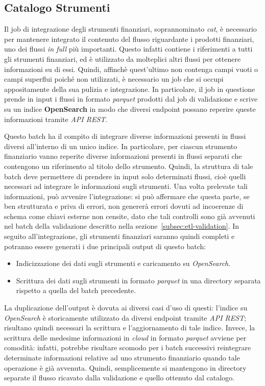 \subsection{Catalogo Strumenti}\label{subsec:etl-cat}
Il job di integrazione degli strumenti finanziari, soprannominato \textit{cat}, è necessario per mantenere integrato il contenuto del flusso riguardante i prodotti finanziari, uno dei flussi \textit{in full} più importanti.
Questo infatti contiene i riferimenti a tutti gli strumenti finanziari, ed è utilizzato da molteplici altri flussi per ottenere informazioni su di essi.
Quindi, affinchè quest'ultimo non contenga campi vuoti o campi superflui poiché non utilizzati, è necessario un job che si occupi appositamente della sua pulizia e integrazione.
In particolare, il job in questione prende in input i flussi in formato \textit{parquet} prodotti dal job di validazione e scrive su un indice \textbf{OpenSearch} in modo che diversi endpoint possano reperire queste informazioni tramite \textit{API REST}.

Questo batch ha il compito di integrare diverse informazioni presenti in flussi diversi all'interno di un unico indice.
In particolare, per ciascun strumento finanziario vanno reperite diverse informazioni presenti in flussi separati che contengono un riferimento al titolo dello strumento.
Quindi, la struttura di tale batch deve permettere di prendere in input solo determinati flussi, cioè quelli necessari ad integrare le informazioni sugli strumenti.
Una volta prelevate tali informazioni, può avvenire l'integrazione:
si può affermare che questa parte, se ben strutturata e priva di errori, non genererà errori dovuti ad incoerenze di schema come chiavi esterne non censite, dato che tali controlli sono già avvenuti nel batch della validazione descritto nella sezione~\ref{subsec:etl-validation}.
In seguito all'integrazione, gli strumenti finanziari saranno quindi completi e potranno essere generati i due principali output di questo batch:
\begin{itemize}
    \item Indicizzazione dei dati sugli strumenti e caricamento su \textit{OpenSearch}.
    \item Scrittura dei dati sugli strumenti in formato \textit{parquet} in una directory separata rispetto a quella del batch precedente.
\end{itemize}
La duplicazione dell'output è dovuta ai diversi casi d'uso di questi:
l'indice su \textit{OpenSearch} è storicamente utilizzato da diversi endpoint tramite \textit{API REST};
risultano quindi necessari la scrittura e l'aggiornamento di tale indice.
Invece, la scrittura delle medesime informazioni in \textit{cloud} in formato \textit{parquet} avviene per comodità:
infatti, potrebbe risultare scomodo per i batch successivi reintegrare determinate informazioni relative ad uno strumento finanziario quando tale operazione è già avvenuta.
Quindi, semplicemente si mantengono in directory separate il flusso ricavato dalla validazione e quello ottenuto dal catalogo.

